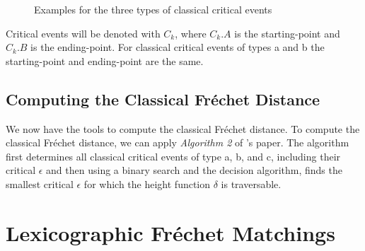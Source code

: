 \begin{figure}[H]
    \centering
    
    \qquad
    \qquad

	\caption{Examples for the three types of classical critical events}
    \label{fig:classical_critical_events}
\end{figure}

\addtocounter{footnote}{-3} %

Critical events will be denoted with $C_k$, where $C_k.A$ is the starting-point and $C_k.B$ is the ending-point. For classical critical events of types a and b the starting-point and ending-point are the same.


\subsection{Computing the Classical Fréchet Distance}

We now have the tools to compute the classical Fréchet distance. To compute the classical Fréchet distance, we can apply \textit{Algorithm 2} of \citeauthor*{altgodau}'s paper.\cite{altgodau} The algorithm first determines all classical critical events of type a, b, and c, including their critical $\epsilon$ and then using a binary search and the decision algorithm, finds the smallest critical $\epsilon$ for which the height function $\delta$ is traversable.


\section{Lexicographic Fréchet Matchings}

